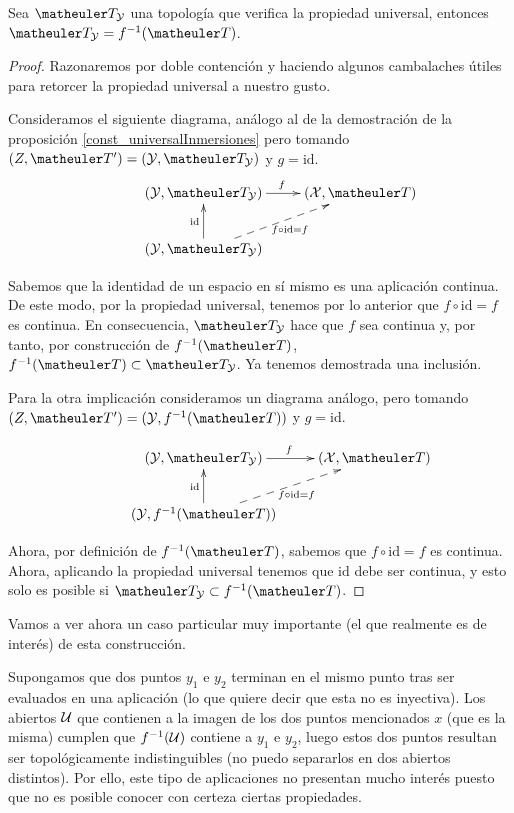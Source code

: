 \begin{prop}
	Sea $\T_\Y$ una topología que verifica la propiedad universal, entonces $\T_\Y=f^{-1}(\T)$.
\end{prop}
\begin{proof}
	Razonaremos por doble contención y haciendo algunos cambalaches útiles para retorcer la propiedad universal a nuestro gusto.
	
	Consideramos el siguiente diagrama, análogo al de la demostración de la proposición \ref{const_universalInmersiones} pero tomando $(Z,\T')=(\Y,\T_\Y)$ y $g=\text{id}$.
	\begin{equation*}
	\xymatrix{
		&(\mathcal{Y},\T_{\mathcal{Y}}) \ar[r]^f
		&(\mathcal{X},\T) \\
		&(\mathcal{Y},\T_{\mathcal{Y}}) \ar@{-->}[ru]_{f\circ \text{id}=f} \ar[u]^{\text{id}}}
	\end{equation*}
	
	Sabemos que la identidad de un espacio en sí mismo es una aplicación continua. De este modo, por la propiedad universal, tenemos por lo anterior que $f\circ\text{id}=f$ es continua. En consecuencia, $\T_{\mathcal{Y}}$ hace que $f$ sea continua y, por tanto, por construcción de $f^{-1}(\T)$, $f^{-1}(\T)\subset \T_\Y$. Ya tenemos demostrada una inclusión.
	
	Para la otra implicación consideramos un diagrama análogo, pero tomando $(Z,\T')=(\Y,f^{-1}(\T))$ y $g=\text{id}$.  
	
	\begin{equation*}
	\xymatrix{
		&(\mathcal{Y},\T_{\mathcal{Y}}) \ar[r]^f
		&(\mathcal{X},\T) \\
		&(\mathcal{Y},f^{-1}(\T)) \ar@{-->}[ru]_{f\circ \text{id}=f} \ar[u]^{\text{id}}}
	\end{equation*}
	
	Ahora, por definición de $f^{-1}(\T)$, sabemos que $f\circ\text{id}=f$ es continua. Ahora, aplicando la propiedad universal tenemos que $\text{id}$ debe ser continua, y esto solo es posible si $\T_\Y\subset f^{-1}(\T)$.
\end{proof}
\begin{obs}[Inyectividad] Vamos a ver ahora un caso particular muy importante (el que realmente es de interés) de esta construcción.

Supongamos que dos puntos $y_1$ e $y_2$ terminan en el mismo punto tras ser evaluados en una aplicación (lo que quiere decir que esta no es inyectiva). Los abiertos $\mathcal{U}$ que contienen a la imagen de los dos puntos mencionados $x$ (que es la misma) cumplen que $f^{-1}(\mathcal{U})$ contiene a $y_1$ e $y_2$, luego estos dos puntos resultan ser topológicamente indistinguibles (no puedo separarlos en dos abiertos distintos). Por ello, este tipo de aplicaciones no presentan mucho interés puesto que no es posible conocer con certeza ciertas propiedades.
\end{obs}
